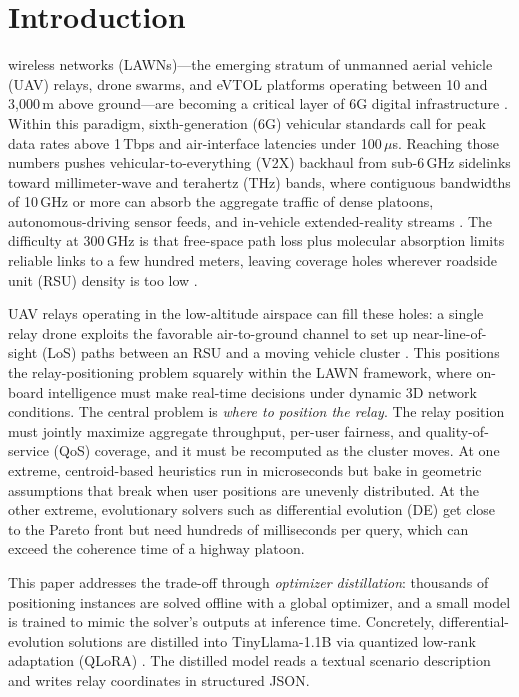 \documentclass[journal]{IEEEtran}
\begin{document}
\section{Introduction}
\label{sec:introduction}

 wireless networks (LAWNs)---the emerging stratum of unmanned aerial vehicle (UAV) relays, drone swarms, and eVTOL platforms operating between 10 and 3{,}000\,m above ground---are becoming a critical layer of 6G digital infrastructure \cite{rappaport2019}. Within this paradigm, sixth-generation (6G) vehicular standards call for peak data rates above 1\,Tbps and air-interface latencies under 100\,$\mu$s. Reaching those numbers pushes vehicular-to-everything (V2X) backhaul from sub-6\,GHz sidelinks toward millimeter-wave and terahertz (THz) bands, where contiguous bandwidths of 10\,GHz or more can absorb the aggregate traffic of dense platoons, autonomous-driving sensor feeds, and in-vehicle extended-reality streams \cite{akyildiz2022, chaccour2022}. The difficulty at 300\,GHz is that free-space path loss plus molecular absorption limits reliable links to a few hundred meters, leaving coverage holes wherever roadside unit (RSU) density is too low \cite{sarieddeen2021}.

UAV relays operating in the low-altitude airspace can fill these holes: a single relay drone exploits the favorable air-to-ground channel to set up near-line-of-sight (LoS) paths between an RSU and a moving vehicle cluster \cite{zeng2016wireless}. This positions the relay-positioning problem squarely within the LAWN framework, where on-board intelligence must make real-time decisions under dynamic 3D network conditions. The central problem is \emph{where to position the relay}. The relay position must jointly maximize aggregate throughput, per-user fairness, and quality-of-service (QoS) coverage, and it must be recomputed as the cluster moves. At one extreme, centroid-based heuristics \cite{zeng2016throughput} run in microseconds but bake in geometric assumptions that break when user positions are unevenly distributed. At the other extreme, evolutionary solvers such as differential evolution (DE) \cite{storn1997} get close to the Pareto front but need hundreds of milliseconds per query, which can exceed the coherence time of a highway platoon.

This paper addresses the trade-off through \emph{optimizer distillation}: thousands of positioning instances are solved offline with a global optimizer, and a small model is trained to mimic the solver's outputs at inference time. Concretely, differential-evolution solutions are distilled into TinyLlama-1.1B \cite{zhang2024tinyllama} via quantized low-rank adaptation (QLoRA) \cite{dettmers2023qlora}. The distilled model reads a textual scenario description and writes relay coordinates in structured JSON.
\end{document}
